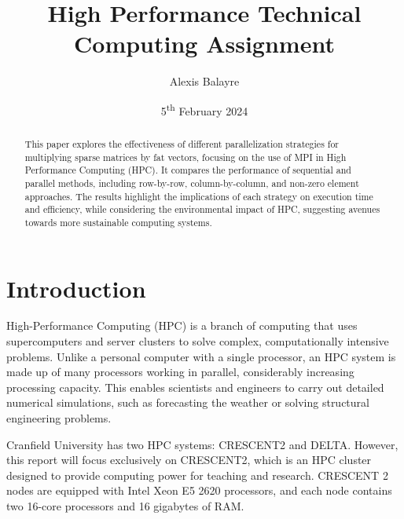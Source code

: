 \documentclass[12pt,oneside]{book} %
\title{High Performance Technical Computing Assignment}
\author{Alexis Balayre}
\date{5\textsuperscript{th} February 2024}
\begin{document}
\frontmatter

\maketitle

\begin{abstract}
    This paper explores the effectiveness of different parallelization strategies
    for multiplying sparse matrices by fat vectors, focusing on the use of MPI
    in High Performance Computing (HPC). It compares the performance of sequential
    and parallel methods, including row-by-row, column-by-column, and non-zero element
    approaches. The results highlight the implications of each strategy on execution time
    and efficiency, while considering the environmental impact of HPC, suggesting avenues
    towards more sustainable computing systems.
\end{abstract}

{
\clearpage
\singlespacing
{
    \tableofcontents
}
\clearpage

\listoffigures

\listoftables
}

\mainmatter
\pagestyle{fancy}
\fancyhead[L]{\nouppercase{\leftmark}}
\fancyhead[R]{\nouppercase{\rightmark}}

\chapter{Introduction}
High-Performance Computing (HPC) is a branch of computing that uses
supercomputers and server clusters to solve complex, computationally intensive
problems. Unlike a personal computer with a single processor, an HPC system is
made up of many processors working in parallel, considerably increasing
processing capacity. This enables scientists and engineers to carry out
detailed numerical simulations, such as forecasting the weather or solving
structural engineering problems.

Cranfield University has two HPC systems: CRESCENT2 and DELTA. However, this
report will focus exclusively on CRESCENT2, which is an HPC cluster designed to
provide computing power for teaching and research. CRESCENT 2 nodes are
equipped with Intel Xeon E5 2620 processors, and each node contains two 16-core
processors and 16 gigabytes of RAM.
\end{document}

